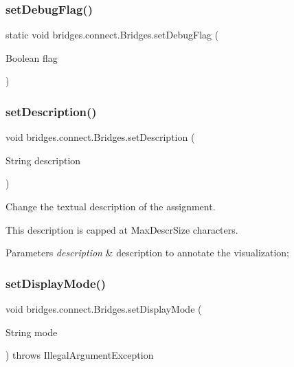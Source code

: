 \subsubsection{\texorpdfstring{set\+Debug\+Flag()}{setDebugFlag()}}
{\footnotesize\ttfamily static void bridges.\+connect.\+Bridges.\+set\+Debug\+Flag (\begin{DoxyParamCaption}\item[{Boolean}]{flag }\end{DoxyParamCaption})\hspace{0.3cm}{\ttfamily [static]}}

\mbox{\label{classbridges_1_1connect_1_1_bridges_a50d1d5aa64d312393b63d1be854e34a2}} 
\subsubsection{\texorpdfstring{set\+Description()}{setDescription()}}
{\footnotesize\ttfamily void bridges.\+connect.\+Bridges.\+set\+Description (\begin{DoxyParamCaption}\item[{String}]{description }\end{DoxyParamCaption})}



Change the textual description of the assignment. 

This description is capped at Max\+Descr\+Size characters.


\begin{DoxyParams}{Parameters}
{\em description} & description to annotate the visualization; \\
\hline
\end{DoxyParams}
\mbox{\label{classbridges_1_1connect_1_1_bridges_aaa1a44a689daa26a841d0e8d31839861}} 
\subsubsection{\texorpdfstring{set\+Display\+Mode()}{setDisplayMode()}}
{\footnotesize\ttfamily void bridges.\+connect.\+Bridges.\+set\+Display\+Mode (\begin{DoxyParamCaption}\item[{String}]{mode }\end{DoxyParamCaption}) throws Illegal\+Argument\+Exception}

